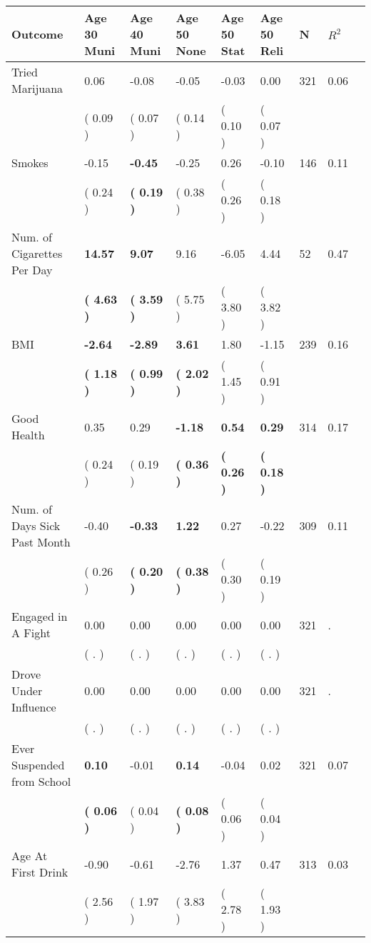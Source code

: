 \begin{tabular}{L{6.2cm} C{1.8cm} C{1.8cm} C{1.8cm} C{1.8cm} C{1.8cm} C{1.8cm} C{0.3cm} C{0.3cm}}
\toprule
 \textbf{Outcome} & \textbf{Age 30 Muni} & \textbf{Age 40 Muni} & \textbf{Age 50 None} & \textbf{Age 50 Stat} & \textbf{Age 50 Reli} & \textbf{N} & \textbf{$ R^2$} \\
\midrule
Tried Marijuana &      0.06 &     -0.08 &     -0.05 &     -0.03 &      0.00  & 321 &       0.06 \\ 
 & (     0.09 ) & (     0.07 ) & (     0.14 ) & (     0.10 ) & (     0.07 )  & \\
Smokes &     -0.15 & \textbf{    -0.45} &     -0.25 &      0.26 &     -0.10  & 146 &       0.11 \\ 
 & (     0.24 ) & \textbf{(     0.19 )} & (     0.38 ) & (     0.26 ) & (     0.18 )  & \\
Num. of Cigarettes Per Day & \textbf{    14.57} & \textbf{     9.07} &      9.16 &     -6.05 &      4.44  & 52 &       0.47 \\ 
 & \textbf{(     4.63 )} & \textbf{(     3.59 )} & (     5.75 ) & (     3.80 ) & (     3.82 )  & \\
BMI & \textbf{    -2.64} & \textbf{    -2.89} & \textbf{     3.61} &      1.80 &     -1.15  & 239 &       0.16 \\ 
 & \textbf{(     1.18 )} & \textbf{(     0.99 )} & \textbf{(     2.02 )} & (     1.45 ) & (     0.91 )  & \\
Good Health &      0.35 &      0.29 & \textbf{    -1.18} & \textbf{     0.54} & \textbf{     0.29}  & 314 &       0.17 \\ 
 & (     0.24 ) & (     0.19 ) & \textbf{(     0.36 )} & \textbf{(     0.26 )} & \textbf{(     0.18 )}  & \\
Num. of Days Sick Past Month &     -0.40 & \textbf{    -0.33} & \textbf{     1.22} &      0.27 &     -0.22  & 309 &       0.11 \\ 
 & (     0.26 ) & \textbf{(     0.20 )} & \textbf{(     0.38 )} & (     0.30 ) & (     0.19 )  & \\
Engaged in A Fight &      0.00 &      0.00 &      0.00 &      0.00 &      0.00  & 321 &          . \\ 
 & (        . ) & (        . ) & (        . ) & (        . ) & (        . )  & \\
Drove Under Influence &      0.00 &      0.00 &      0.00 &      0.00 &      0.00  & 321 &          . \\ 
 & (        . ) & (        . ) & (        . ) & (        . ) & (        . )  & \\
Ever Suspended from School & \textbf{     0.10} &     -0.01 & \textbf{     0.14} &     -0.04 &      0.02  & 321 &       0.07 \\ 
 & \textbf{(     0.06 )} & (     0.04 ) & \textbf{(     0.08 )} & (     0.06 ) & (     0.04 )  & \\
Age At First Drink &     -0.90 &     -0.61 &     -2.76 &      1.37 &      0.47  & 313 &       0.03 \\ 
 & (     2.56 ) & (     1.97 ) & (     3.83 ) & (     2.78 ) & (     1.93 )  & \\
\bottomrule
\end{tabular}
